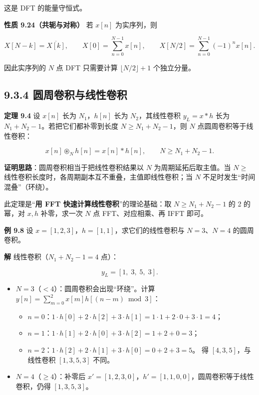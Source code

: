 这是 DFT 的能量守恒式。

\textbf{性质 9.24（共轭与对称）} 若 \(x[n]\) 为实序列，则

\[
X[N-k]=\overline{X[k]},\qquad X[0]=\sum_{n=0}^{N-1}x[n],\qquad X[N/2]=\sum_{n=0}^{N-1}(-1)^n x[n].
\]

因此实序列的 \(N\) 点 DFT 只需要计算 \(\lfloor N/2\rfloor+1\)
个独立分量。

\subsection{9.3.4
圆周卷积与线性卷积}\label{ux5706ux5468ux5377ux79efux4e0eux7ebfux6027ux5377ux79ef}

\textbf{定理 9.4} 设 \(x[n]\) 长为 \(N_1\)，\(h[n]\) 长为
\(N_2\)，其线性卷积 \(y_L=x*h\) 长为 \(N_1+N_2-1\)。若把它们都补零到长度
\(N\ge N_1+N_2-1\)，则 \(N\) 点圆周卷积等于线性卷积：

\[
x[n]\circledast_N h[n] = x[n]*h[n],\qquad N\ge N_1+N_2-1 .
\]

\textbf{证明思路}：圆周卷积相当于把线性卷积结果以 \(N\)
为周期延拓后取主值。当 \(N\ge\)
线性卷积长度时，各周期副本互不重叠，主值即线性卷积；当 \(N\)
不足时发生``时间混叠''（环绕）。

此定理是``\textbf{用 FFT 快速计算线性卷积}''的理论基础：取
\(N\ge N_1+N_2-1\) 的 2 的幂，对 \(x,h\) 补零，求一次 \(N\) 点
FFT、对应相乘、再 IFFT 即可。

\textbf{例 9.8} 设 \(x=[1,2,3]\)，\(h=[1,1]\)，求它们的线性卷积与
\(N=3\)、\(N=4\) 的圆周卷积。

\textbf{解} 线性卷积（\(N_1+N_2-1=4\) 点）：

\[
y_L = [1,\; 3,\; 5,\; 3].
\]

\begin{itemize}
\tightlist
\item
  \(N=3\)（\(<4\)）：圆周卷积会出现``环绕''。计算
  \(y[n]=\sum_{m=0}^{2}x[m]h[(n-m)\bmod 3]\)：

  \begin{itemize}
  \tightlist
  \item
    \(n=0\)：\(1\cdot h[0]+2\cdot h[2]+3\cdot h[1]=1\cdot1+2\cdot0+3\cdot1=4\)；
  \item
    \(n=1\)：\(1\cdot h[1]+2\cdot h[0]+3\cdot h[2]=1+2+0=3\)；
  \item
    \(n=2\)：\(1\cdot h[2]+2\cdot h[1]+3\cdot h[0]=0+2+3=5\)。 得
    \([4,3,5]\)，与线性卷积 \([1,3,5,3]\) 不同。
  \end{itemize}
\item
  \(N=4\)（\(\ge4\)）：补零后
  \(x'=[1,2,3,0]\)，\(h'=[1,1,0,0]\)，圆周卷积等于线性卷积，仍得
  \([1,3,5,3]\)。
\end{itemize}

